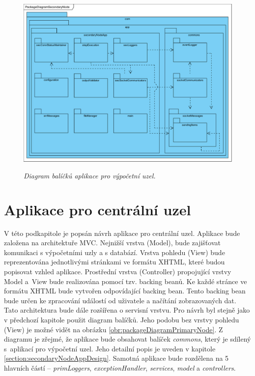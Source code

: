 \begin{figure}[H]
\begin{center}
    \scalebox{0.5}
    {
        \includegraphics{images/PackageDiagramSecondaryNode.pdf}
    }
    \caption{\label{obr:packageDiagramSecondaryNode} {\it Diagram balíčků aplikace pro výpočetní uzel.}}
\end{center}
\end{figure}

\section{Aplikace pro centrální uzel}
\label{section:primaryNodeAppDesign}

V této podkapitole je popsán návrh aplikace pro centrální uzel. Aplikace bude založena na architektuře MVC. Nejnižší vrstva (Model), bude zajišťovat komunikaci s výpočetními uzly a s databází. Vrstva pohledu (View) bude reprezentována jednotlivými stránkami ve formátu XHTML, které budou popisovat vzhled aplikace. Prostřední vrstva (Controller) propojující vrstvy Model a~View bude realizována pomocí tzv. backing beanů. Ke každé stránce ve formátu XHTML bude vytvořen odpovídající backing bean. Tento backing bean bude určen ke zpracování událostí od uživatele a načítání zobrazovaných dat. Tato architektura bude dále rozšířena o servisní vrstvu. Pro návrh byl stejně jako v předchozí kapitole použit diagram balíčků. Jeho podobu bez vrstvy pohledu (View) je možné vidět na obrázku \ref{obr:packageDiagramPrimaryNode}. Z diagramu je zřejmé, že aplikace bude obsahovat balíček \textit{commons}, který je sdílený s~aplikací pro výpočetní uzel. Jeho detailní popis je uveden v kapitole \ref{section:secondaryNodeAppDesign}. Samotná aplikace bude rozdělena na 5 hlavních částí -- \textit{primLoggers}, \textit{exceptionHandler}, \textit{services}, \textit{model} a \textit{controllers}.

